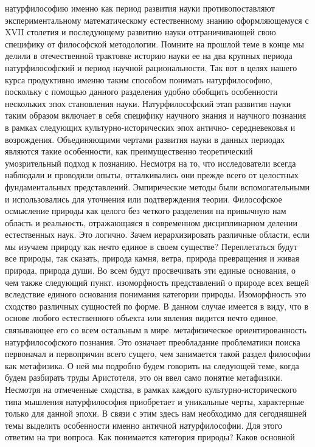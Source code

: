 натурфилософию именно как период развития науки противопоставляют
экспериментальному математическому естественному знанию оформляющемуся с XVII
столетия и последующему развитию науки отграничивающей свою специфику от
философской методологии. Помните на прошлой теме в конце мы делили в
отечественной трактовке историю науки ее на два крупных периода натурфилософский
и период научной рациональности. Так вот в целях нашего курса продуктивно именно
таким способом понимать натурфилософию, поскольку с помощью данного разделения
удобно обобщить особенности нескольких эпох становления науки. Натурфилософский
этап развития науки таким образом включает в себя специфику научного знания и
научного познания в рамках следующих культурно-исторических эпох антично-
середневековья и возрождения. Объединяющими чертами развития науки в данных
периодах являются такие особенности, как преимущественно теоретический
умозрительный подход к познанию. Несмотря на то, что исследователи всегда
наблюдали и проводили опыты, отталкивались они прежде всего от целостных
фундаментальных представлений. Эмпирические методы были вспомогательными и
использовались для уточнения или подтверждения теории. Философское осмысление
природы как целого без четкого разделения на привычную нам область и реальность,
отражающаяся в современном дисциплинарном делении естественных наук. Это
логично. Зачем иерархизировать различные области, если мы изучаем природу как
нечто единое в своем существе? Переплетаться будут все природы, так сказать,
природа камня, ветра, природа превращения и живая природа, природа души. Во всем
будут просвечивать эти единые основания, о чем также следующий пункт.
изоморфность представлений о природе всех вещей вследствие единого основания
понимания категории природы. Изоморфность это сходство различных сущностей по
форме. В данном случае имеется в виду, что в основе любого естественного объекта
или явления видится нечто единое, связывающее его со всем остальным в мире.
метафизическое ориентированность натурфилософского познания. Это означает
преобладание проблематики поиска первоначал и первопричин всего сущего, чем
занимается такой раздел философии как метафизика. О ней мы подробно будем
говорить на следующей теме, когда будем разбирать труды Аристотеля, это он ввел
само понятие метафизики. Несмотря на отмеченные сходства, в рамках каждого
культурно-исторического типа мышления натурфилософия приобретает и уникальные
черты, характерные только для данной эпохи. В связи с этим здесь нам необходимо
для сегодняшней темы выделить особенности именно античной натурфилософии. Для
этого ответим на три вопроса. Как понимается категория природы? Каков основной
